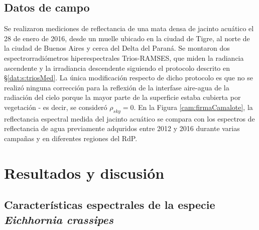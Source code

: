     \subsection{Datos de campo}
    \label{cam:s:data}
        Se realizaron mediciones de reflectancia de una mata densa de jacinto acuático el 28 de enero de 2016, desde un muelle ubicado en la ciudad de Tigre, al norte de la ciudad de Buenos Aires y cerca del Delta del Paraná. Se montaron dos espectrorradiómetros hiperespectrales Trios-RAMSES, que miden la radiancia ascendente y la irradiancia descendente siguiendo el protocolo descrito en \S \ref{dat:s:triosMed}. La única modificación respecto de dicho protocolo es que no se realizó ninguna corrección para la reflexión de la interfase aire-agua de la radiación del cielo porque la mayor parte de la superficie estaba cubierta por vegetación - es decir, se consideró $\rho_{sky}=0$.
        En la Figura \ref{cam:firmaCamalote}, la reflectancia espectral medida del jacinto acuático se compara con los espectros de reflectancia de agua previamente adquridos entre 2012 y 2016 durante varias campañas y en diferentes regiones del RdP.

\section{Resultados y discusión}
\label{cam:s:resultados}

    \subsection{Características espectrales de la especie \textit{Eichhornia crassipes}}
    \label{cam:s:eichhornia}

